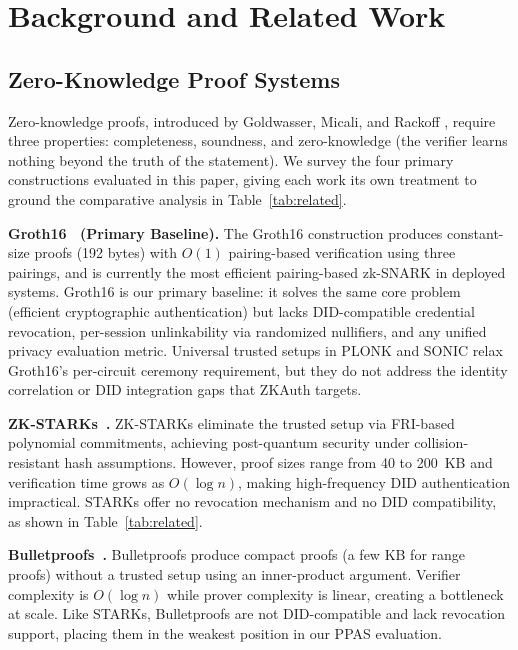 \documentclass[journal,12pt,onecolumn]{IEEEtran}
\begin{document}
\section{Background and Related Work}
\label{sec:background}

\subsection{Zero-Knowledge Proof Systems}

Zero-knowledge proofs, introduced by Goldwasser, Micali, and Rackoff
\cite{goldwasser1989knowledge}, require three properties: completeness,
soundness, and zero-knowledge (the verifier learns nothing beyond the
truth of the statement). We survey the four primary constructions
evaluated in this paper, giving each work its own treatment to ground
the comparative analysis in Table~\ref{tab:related}.

\textbf{Groth16~\cite{groth2016size} (Primary Baseline).}
The Groth16 construction produces constant-size proofs (192 bytes) with
$O(1)$ pairing-based verification using three pairings, and is currently
the most efficient pairing-based zk-SNARK in deployed systems. Groth16
is our primary baseline: it solves the same core problem (efficient
cryptographic authentication) but lacks DID-compatible credential
revocation, per-session unlinkability via randomized nullifiers, and
any unified privacy evaluation metric. Universal trusted setups in PLONK
\cite{gabizon2019plonk} and SONIC \cite{maller2019sonic} relax Groth16's
per-circuit ceremony requirement, but they do not address the identity
correlation or DID integration gaps that ZKAuth targets.

\textbf{ZK-STARKs~\cite{bensasson2019scalable}.}
ZK-STARKs eliminate the trusted setup via FRI-based polynomial
commitments, achieving post-quantum security under collision-resistant
hash assumptions. However, proof sizes range from 40 to 200~KB and
verification time grows as $O(\log n)$, making high-frequency
DID authentication impractical. STARKs offer no revocation mechanism
and no DID compatibility, as shown in Table~\ref{tab:related}.

\textbf{Bulletproofs~\cite{bunz2018bulletproofs}.}
Bulletproofs produce compact proofs (a few KB for range proofs) without
a trusted setup using an inner-product argument. Verifier complexity is
$O(\log n)$ while prover complexity is linear, creating a bottleneck at
scale. Like STARKs, Bulletproofs are not DID-compatible and lack
revocation support, placing them in the weakest position in our PPAS
evaluation.
\end{document}
